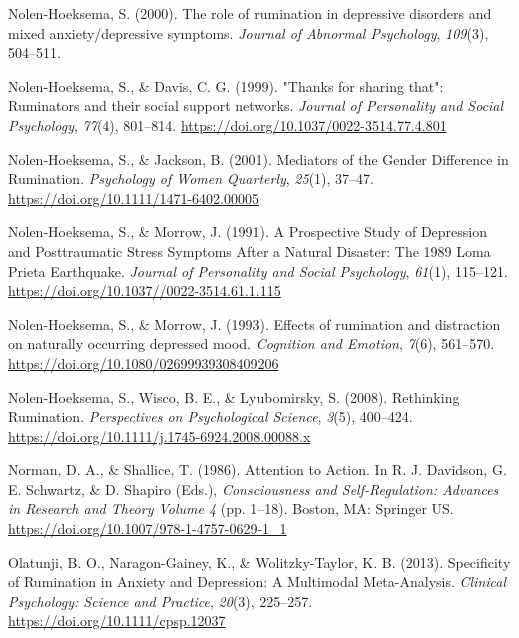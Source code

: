 \documentclass[a4paper,12pt,twoside,openright,oldfontcommands]{memoir}
\begin{document}
\leavevmode\hypertarget{ref-Nolen-Hoeksema2000}{}%
Nolen-Hoeksema, S. (2000). The role of rumination in depressive disorders and mixed anxiety/depressive symptoms. \emph{Journal of Abnormal Psychology}, \emph{109}(3), 504--511.

\leavevmode\hypertarget{ref-nolen-hoeksema_thanks_1999}{}%
Nolen-Hoeksema, S., \& Davis, C. G. (1999). "Thanks for sharing that": Ruminators and their social support networks. \emph{Journal of Personality and Social Psychology}, \emph{77}(4), 801--814. \url{https://doi.org/10.1037/0022-3514.77.4.801}

\leavevmode\hypertarget{ref-nolen-hoeksema_mediators_2001}{}%
Nolen-Hoeksema, S., \& Jackson, B. (2001). Mediators of the Gender Difference in Rumination. \emph{Psychology of Women Quarterly}, \emph{25}(1), 37--47. \url{https://doi.org/10.1111/1471-6402.00005}

\leavevmode\hypertarget{ref-nolen-hoeksema_prospective_1991}{}%
Nolen-Hoeksema, S., \& Morrow, J. (1991). A Prospective Study of Depression and Posttraumatic Stress Symptoms After a Natural Disaster: The 1989 Loma Prieta Earthquake. \emph{Journal of Personality and Social Psychology}, \emph{61}(1), 115--121. \url{https://doi.org/10.1037//0022-3514.61.1.115}

\leavevmode\hypertarget{ref-nolen-hoeksema_effects_1993}{}%
Nolen-Hoeksema, S., \& Morrow, J. (1993). Effects of rumination and distraction on naturally occurring depressed mood. \emph{Cognition and Emotion}, \emph{7}(6), 561--570. \url{https://doi.org/10.1080/02699939308409206}

\leavevmode\hypertarget{ref-Nolen-Hoeksema2008}{}%
Nolen-Hoeksema, S., Wisco, B. E., \& Lyubomirsky, S. (2008). Rethinking Rumination. \emph{Perspectives on Psychological Science}, \emph{3}(5), 400--424. \url{https://doi.org/10.1111/j.1745-6924.2008.00088.x}

\leavevmode\hypertarget{ref-norman_attention_1986}{}%
Norman, D. A., \& Shallice, T. (1986). Attention to Action. In R. J. Davidson, G. E. Schwartz, \& D. Shapiro (Eds.), \emph{Consciousness and Self-Regulation: Advances in Research and Theory Volume 4} (pp. 1--18). Boston, MA: Springer US. \url{https://doi.org/10.1007/978-1-4757-0629-1_1}

\leavevmode\hypertarget{ref-olatunji_specificity_2013}{}%
Olatunji, B. O., Naragon-Gainey, K., \& Wolitzky-Taylor, K. B. (2013). Specificity of Rumination in Anxiety and Depression: A Multimodal Meta-Analysis. \emph{Clinical Psychology: Science and Practice}, \emph{20}(3), 225--257. \url{https://doi.org/10.1111/cpsp.12037}
\end{document}

